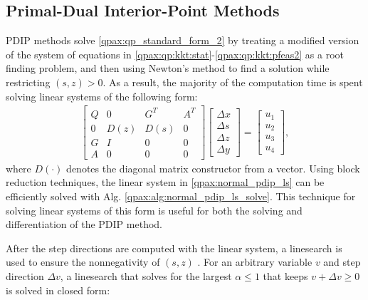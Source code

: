 \subsection{Primal-Dual Interior-Point Methods}
PDIP methods solve \eqref{qpax:qp_standard_form_2} by treating a modified version of the system of equations in \eqref{qpax:qp:kkt:stat}-\eqref{qpax:qp:kkt:pfeas2} as a root finding problem, and then using Newton's method to find a solution while restricting $(s, z) > 0$. As a result, the majority of the computation time is spent solving linear systems of the following form:
\begin{align}
    \begin{bmatrix}
Q & 0 & G^{T} & A^{T} \\
0 & D(z) & D(s) & 0 \\
G & I & 0 & 0 \\
A & 0 & 0 & 0
\end{bmatrix} \begin{bmatrix}
\Delta x\\
\Delta s \\
\Delta z \\
\Delta y
\end{bmatrix}=\begin{bmatrix}
u_1 \\ u_2 \\ u_3 \\ u_4
\end{bmatrix}, \label{qpax:normal_pdip_ls}
\end{align}
where $D(\cdot)$ denotes the diagonal matrix constructor from a vector. Using block reduction techniques, the linear system in \eqref{qpax:normal_pdip_ls} can be efficiently solved with Alg. \eqref{qpax:alg:normal_pdip_ls_solve}. This technique for solving linear systems of this form is useful for both the solving and differentiation of the PDIP method.

After the step directions are computed with the linear system, a linesearch is used to ensure the nonnegativity of $(s, z)$ .  For an arbitrary variable $v$ and step direction $\Delta v$, a linesearch that solves for the largest $\alpha \leq 1$ that keeps $v + \Delta v\geq 0$ is solved in closed form:


